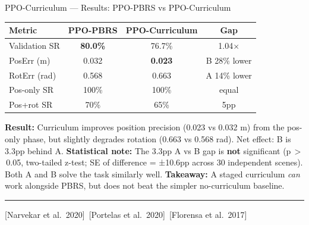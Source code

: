 \documentclass[aspectratio=169,xcolor=dvipsnames,t]{beamer}
\newcommand{\litfooter}[1]{%
  \vspace{2pt}%
  \hrule%
  \vspace{2pt}%
  {\tiny\color{LightDarkGrey} #1}%
}
\begin{document}
\begin{frame}[t]{PPO-Curriculum — Results: PPO-PBRS vs PPO-Curriculum}
  \begin{center}
  \footnotesize
  \begin{tabular}{lccc}
    \toprule
    \textbf{Metric} & \textbf{PPO-PBRS} & \textbf{PPO-Curriculum} & \textbf{Gap} \\
    \midrule
    Validation SR & \textcolor{hlgreen}{\textbf{80.0\%}} & 76.7\% & 1.04$\times$ \\
    PosErr (m) & 0.032 & \textcolor{hlgreen}{\textbf{0.023}} & B 28\% lower \\
    RotErr (rad) & 0.568 & 0.663 & A 14\% lower \\
    Pos-only SR & 100\% & 100\% & equal \\
    Pos+rot SR & 70\% & 65\% & 5pp \\
    \bottomrule
  \end{tabular}
  \end{center}
  \vspace{1pt}
  {\scriptsize \textbf{Result:} Curriculum improves position precision (0.023 vs 0.032 m) from the pos-only phase, but slightly degrades rotation (0.663 vs 0.568 rad). Net effect: B is 3.3pp behind A.}
  {\scriptsize \textbf{Statistical note:} The 3.3pp A vs B gap is \textbf{not} significant (p\,$>$\,0.05, two-tailed z-test; SE of difference = ±10.6pp across 30 independent scenes). Both A and B solve the task similarly well.}
  {\scriptsize \textbf{Takeaway:} A staged curriculum \emph{can} work alongside PBRS, but does not beat the simpler no-curriculum baseline.}

  \vfill\litfooter{[Narvekar et al.\ 2020]~[Portelas et al.\ 2020]~[Florensa et al.\ 2017]}
\end{frame}

\end{document}
